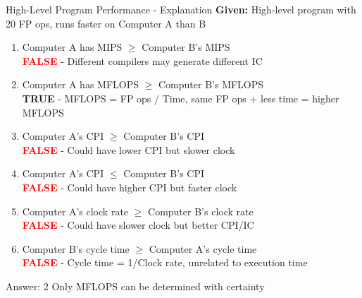 \documentclass[aspectratio=169,12pt]{beamer}
\begin{document}
\begin{frame}{High-Level Program Performance - Explanation}
\scriptsize
\textbf{Given:} High-level program with 20 FP ops, runs faster on Computer A than B

\begin{enumerate}
    \item Computer A has MIPS $\geq$ Computer B's MIPS\\
    \pause
    \hspace{1em}\colorbox{red!20}{\textcolor{red}{\textbf{FALSE}}} - Different compilers may generate different IC
    \pause
    
    \item Computer A has MFLOPS $\geq$ Computer B's MFLOPS\\
    \pause
    \hspace{1em}\colorbox{green!20}{\textcolor{green!50!black}{\textbf{TRUE}}} - MFLOPS = FP ops / Time, same FP ops + less time = higher MFLOPS
    \pause
    
    \item Computer A's CPI $\geq$ Computer B's CPI\\
    \pause
    \hspace{1em}\colorbox{red!20}{\textcolor{red}{\textbf{FALSE}}} - Could have lower CPI but slower clock
    \pause
    
    \item Computer A's CPI $\leq$ Computer B's CPI\\
    \pause
    \hspace{1em}\colorbox{red!20}{\textcolor{red}{\textbf{FALSE}}} - Could have higher CPI but faster clock
    \pause
    
    \item Computer A's clock rate $\geq$ Computer B's clock rate\\
    \pause
    \hspace{1em}\colorbox{red!20}{\textcolor{red}{\textbf{FALSE}}} - Could have slower clock but better CPI/IC
    \pause
    
    \item Computer B's cycle time $\geq$ Computer A's cycle time\\
    \pause
    \hspace{1em}\colorbox{red!20}{\textcolor{red}{\textbf{FALSE}}} - Cycle time = 1/Clock rate, unrelated to execution time
\end{enumerate}

\pause
\begin{alertblock}{Answer: 2}
Only MFLOPS can be determined with certainty
\end{alertblock}
\end{frame}
\end{document}
